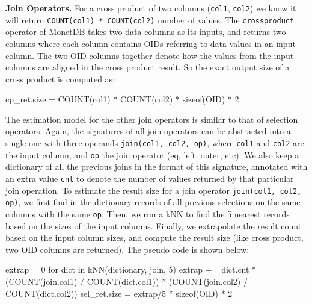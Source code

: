 \documentclass[conference]{IEEEtran}
\def\Skip{\par\medskip\nobreak\noindent}
\begin{document}
\Skip\textbf{Join Operators.}
%
For a cross product of two columns (\texttt{\small col1}, \texttt{\small col2}) we know it will return \texttt{\small COUNT(col1) * COUNT(col2)} number of values.
The \texttt{\small crossproduct} operator of MonetDB takes two data columns as its inputs, and returns two columns where each column contains OIDs referring to data values in an input column.
The two OID columns together denote how the values from the input columns are aligned in the cross product result.
So the exact output size of a cross product is computed as:
\begin{verb}
cp_ret.size = COUNT(col1) * COUNT(col2) * sizeof(OID) * 2
\end{verb}

The estimation model for the other join operators is similar to that of selection operators.
Again, the signatures of all join operators can be abstracted into a single one with three operands \texttt{\small join(col1, col2, op)}, where \texttt{\small col1} and \texttt{\small col2} are the input column, and \texttt{\small op} the join operator (eq, left, outer, etc).
We also keep a dictionary of all the previous joins in the format of this signature, annotated with an extra value \texttt{\small cnt} to denote the number of values returned by that particular join operation.
To estimate the result size for a join operator \texttt{\small join(col1, col2, op)}, we first find in the dictionary records of all previous selections on the same columns with the same \texttt{\small op}. 
Then, we run a kNN to find the 5 nearest records based on the sizes of the input columns.
Finally, we extrapolate the result count based on the input column sizes, and compute the result size (like cross product, two OID columns are returned).
The pseudo code is shown below:
\begin{verb}
extrap = 0
for dict in kNN(dictionary, join, 5)
  extrap += dict.cnt * (COUNT(join.col1) / COUNT(dict.col1)) * 
                       (COUNT(join.col2) / COUNT(dict.col2))
sel_ret.size = extrap/5 * sizeof(OID) * 2
\end{verb}
\end{document}
